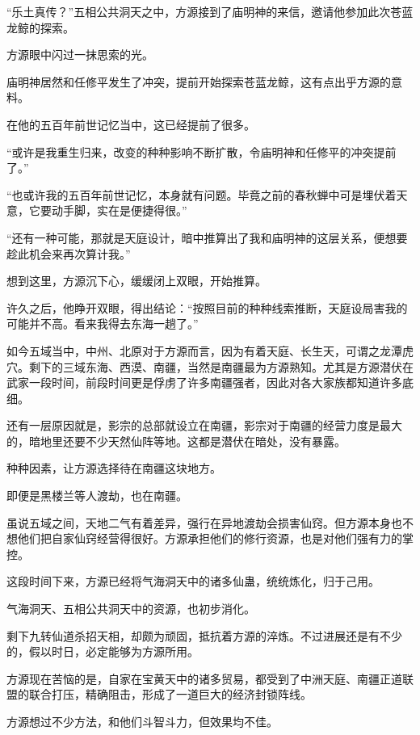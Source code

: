 
\begin{this_body}

“乐土真传？”五相公共洞天之中，方源接到了庙明神的来信，邀请他参加此次苍蓝龙鲸的探索。

方源眼中闪过一抹思索的光。

庙明神居然和任修平发生了冲突，提前开始探索苍蓝龙鲸，这有点出乎方源的意料。

在他的五百年前世记忆当中，这已经提前了很多。

“或许是我重生归来，改变的种种影响不断扩散，令庙明神和任修平的冲突提前了。”

“也或许我的五百年前世记忆，本身就有问题。毕竟之前的春秋蝉中可是埋伏着天意，它要动手脚，实在是便捷得很。”

“还有一种可能，那就是天庭设计，暗中推算出了我和庙明神的这层关系，便想要趁此机会来再次算计我。”

想到这里，方源沉下心，缓缓闭上双眼，开始推算。

许久之后，他睁开双眼，得出结论：“按照目前的种种线索推断，天庭设局害我的可能并不高。看来我得去东海一趟了。”

如今五域当中，中州、北原对于方源而言，因为有着天庭、长生天，可谓之龙潭虎穴。剩下的三域东海、西漠、南疆，当然是南疆最为方源熟知。尤其是方源潜伏在武家一段时间，前段时间更是俘虏了许多南疆强者，因此对各大家族都知道许多底细。

还有一层原因就是，影宗的总部就设立在南疆，影宗对于南疆的经营力度是最大的，暗地里还要不少天然仙阵等地。这都是潜伏在暗处，没有暴露。

种种因素，让方源选择待在南疆这块地方。

即便是黑楼兰等人渡劫，也在南疆。

虽说五域之间，天地二气有着差异，强行在异地渡劫会损害仙窍。但方源本身也不想他们把自家仙窍经营得很好。方源承担他们的修行资源，也是对他们强有力的掌控。

这段时间下来，方源已经将气海洞天中的诸多仙蛊，统统炼化，归于己用。

气海洞天、五相公共洞天中的资源，也初步消化。

剩下九转仙道杀招天相，却颇为顽固，抵抗着方源的淬炼。不过进展还是有不少的，假以时日，必定能够为方源所用。

方源现在苦恼的是，自家在宝黄天中的诸多贸易，都受到了中洲天庭、南疆正道联盟的联合打压，精确阻击，形成了一道巨大的经济封锁阵线。

方源想过不少方法，和他们斗智斗力，但效果均不佳。


\end{this_body}
